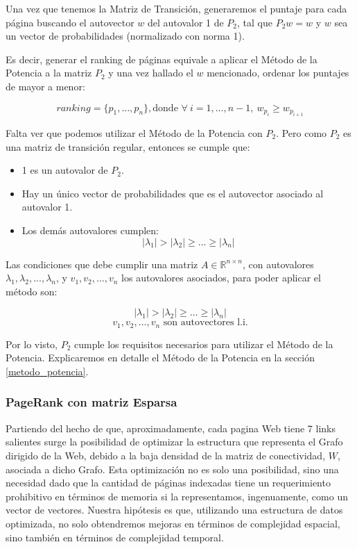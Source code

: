 Una vez que tenemos la Matriz de Transición, generaremos el puntaje para cada página
 buscando el autovector $w$ del autovalor 1 de $P_{2}$, tal que $P_{2}w = w$ y
$w$ sea un vector de probabilidades (normalizado con norma 1).

Es decir, generar el ranking de páginas equivale a aplicar el Método de la Potencia
a la matriz $P_{2}$ y una vez hallado el $w$ mencionado, ordenar los puntajes de
mayor a menor:

\begin{equation} \label{eq:ranking_page_rank}
    ranking = \{ p_1, \dots, p_n \}, \text{donde } \forall\ i=1,\dots,n-1,\ w_{p_{i}} \geq w_{p_{i+1}}
\end{equation}

Falta ver que podemos utilizar el Método de la Potencia con $P_2$. Pero como $P_2$ es una matriz de transición regular, entonces se cumple que:
\begin{itemize}
  \item 1 es un autovalor de $P_2$.
  \item Hay un único vector de probabilidades que es el autovector asociado al autovalor 1.
  \item Los demás autovalores cumplen:
 $$|\lambda_1| > |\lambda_2| \geq \dots \geq |\lambda_n|$$
\end{itemize}

Las condiciones que debe cumplir una matriz $A\in\mathbb{R}^{n \times n}$, con autovalores $\lambda_1,\lambda_2,...,\lambda_n$, y $v_1,v_2,...,v_n$ los autovalores asociados, para poder aplicar el método son:

$$|\lambda_1| > |\lambda_2| \geq \dots \geq |\lambda_n|$$
$$v_1, v_2, \dots, v_n \text{ son autovectores l.i.}$$

Por lo visto, $P_2$ cumple los requisitos necesarios para utilizar el Método de la Potencia.
Explicaremos en detalle el Método de la Potencia en la sección \ref{metodo_potencia}.

\subsubsection{PageRank con matriz Esparsa}

Partiendo del hecho de que, aproximadamente, cada pagina Web tiene 7 links salientes\cite{Kamvar2003} surge la posibilidad de optimizar la estructura que representa el Grafo dirigido de la Web, debido a la baja densidad de la matriz de conectividad, $W$, asociada a dicho Grafo.
Esta optimización no es solo una posibilidad, sino una necesidad dado que la cantidad de páginas indexadas tiene un requerimiento prohibitivo en términos de memoria si la representamos, ingenuamente, como un vector de vectores.
Nuestra hipótesis es que, utilizando una estructura de datos optimizada, no solo obtendremos mejoras en términos de complejidad espacial, sino también en términos de complejidad temporal.

